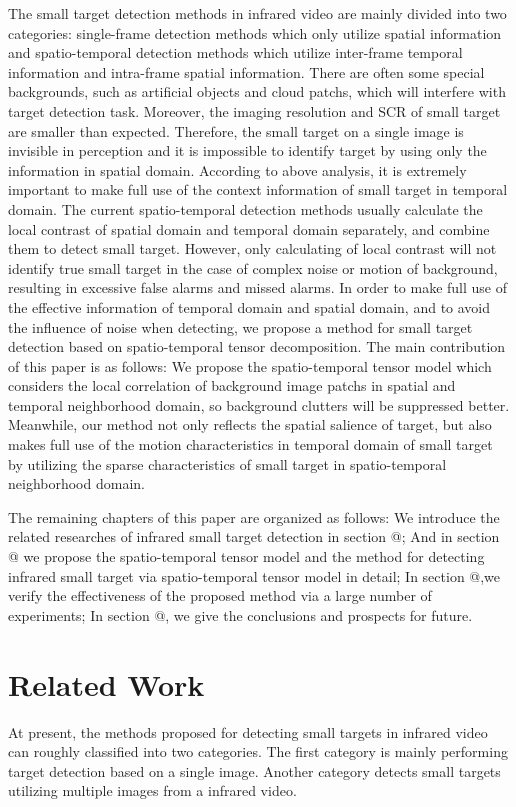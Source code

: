 \documentclass[journal]{IEEEtran}
\makeatletter
\newcommand{\Rmnum}[1]{\expandafter\@slowromancap\romannumeral #1@}
\makeatother
\begin{document}
The small target detection methods in infrared video are mainly divided into two categories: single-frame detection methods which only utilize spatial information and spatio-temporal detection methods which utilize inter-frame temporal information and intra-frame spatial information\cite{li2016novel}. There are often some special backgrounds, such as artificial objects and cloud patchs, which will interfere with target detection task. Moreover, the imaging resolution and SCR of small target are smaller than expected. Therefore, the small target on a single image is invisible in perception and it is impossible to identify target by using only the information in spatial domain. According to above analysis, it is extremely important to make full use of the context information of small target in temporal domain. The current spatio-temporal detection methods usually calculate the local contrast of spatial domain and temporal domain separately, and combine them to detect small target. However, only calculating of local contrast will not identify true small target in the case of complex noise or motion of background, resulting in excessive false alarms and missed alarms. In order to make full use of the effective information of temporal domain and spatial domain, and to avoid the influence of noise when detecting, we propose a method for small target detection based on spatio-temporal tensor decomposition. The main contribution of this paper is as follows: We propose the spatio-temporal tensor model which considers the local correlation of background image patchs in spatial and temporal neighborhood domain, so background clutters will be suppressed better. Meanwhile, our method not only reflects the spatial salience of target, but also makes full use of the motion characteristics in temporal domain of small target by utilizing the sparse characteristics of small target in spatio-temporal neighborhood domain.

The remaining chapters of this paper are organized as follows: We introduce the related researches of infrared small target detection in section \Rmnum{2}; And in section \Rmnum{3} we propose the spatio-temporal tensor model and the method for detecting infrared small target via spatio-temporal tensor model in detail; In section \Rmnum{4},we verify the effectiveness of the proposed method via a large number of experiments; In section \Rmnum{5}, we give the conclusions and prospects for future.

%
%
\section{Related Work}
At present, the methods proposed for detecting small targets in infrared video can roughly classified into two categories. The first category is mainly performing target detection based on a single image. Another category detects small targets utilizing multiple images from a infrared video.
\end{document}
